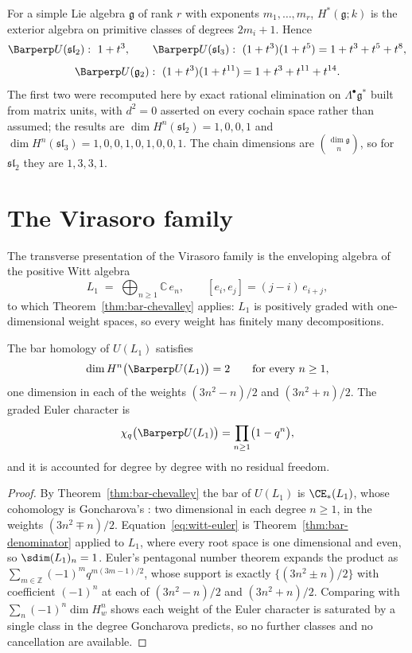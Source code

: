 \begin{computation}
\label{comp:simple}
\StatusComputed{} For a simple Lie algebra $\mathfrak g$ of rank $r$ with
exponents $m_1,\dots,m_r$, $H^*(\mathfrak g;k)$ is the exterior algebra on
primitive classes of degrees $2m_i+1$. Hence
\[
  \Barperp U(\mathfrak{sl}_2):\ 1+t^3, \qquad
  \Barperp U(\mathfrak{sl}_3):\ (1+t^3)(1+t^5) = 1+t^3+t^5+t^8,
\]
\[
  \Barperp U(\mathfrak g_2):\ (1+t^3)(1+t^{11}) = 1+t^3+t^{11}+t^{14}.
\]
The first two were recomputed here by exact rational elimination on
$\Lambda^\bullet\mathfrak g^*$ built from matrix units, with $d^2=0$
asserted on every cochain space rather than assumed; the results are
$\dim H^n(\mathfrak{sl}_2) = 1,0,0,1$ and
$\dim H^n(\mathfrak{sl}_3) = 1,0,0,1,0,1,0,0,1$. The chain dimensions are
$\binom{\dim\mathfrak g}{n}$, so for $\mathfrak{sl}_2$ they are
$1,3,3,1$.
\end{computation}

\section{The Virasoro family}

The transverse presentation of the Virasoro family is the enveloping
algebra of the positive Witt algebra
\[
  L_1 \;=\; \bigoplus_{n\ge1}\mathbb C\,e_n,
  \qquad [e_i,e_j]=(j-i)\,e_{i+j},
\]
to which Theorem~\ref{thm:bar-chevalley} applies: $L_1$ is positively
graded with one-dimensional weight spaces, so every weight has finitely
many decompositions.

\begin{theorem}
\label{thm:pentagonal-rigidity}
\StatusComputed{} The bar homology of $U(L_1)$ satisfies
\[
  \dim H^n\bigl(\Barperp U(L_1)\bigr) = 2
  \qquad\text{for every } n\ge1,
\]
one dimension in each of the weights $(3n^2-n)/2$ and $(3n^2+n)/2$. The
graded Euler character is
\begin{equation}
\label{eq:witt-euler}
  \chi_q\bigl(\Barperp U(L_1)\bigr) = \prod_{n\ge1}\bigl(1-q^n\bigr),
\end{equation}
and it is accounted for degree by degree with no residual freedom.
\end{theorem}

\begin{proof}
By Theorem~\ref{thm:bar-chevalley} the bar of $U(L_1)$ is
$\CE_*(L_1)$, whose cohomology is Goncharova's \cite{Gon73}: two
dimensional in each degree $n\ge1$, in the weights $(3n^2\mp n)/2$.
Equation~\eqref{eq:witt-euler} is Theorem~\ref{thm:bar-denominator}
applied to $L_1$, where every root space is one dimensional and even, so
$\sdim (L_1)_n = 1$. Euler's pentagonal number theorem expands the
product as $\sum_{m\in\mathbb Z}(-1)^mq^{m(3m-1)/2}$, whose support is
exactly $\{(3n^2\pm n)/2\}$ with coefficient $(-1)^n$ at each of
$(3n^2-n)/2$ and $(3n^2+n)/2$. Comparing with $\sum_n(-1)^n\dim H^n_w$
shows each weight of the Euler character is saturated by a single class in
the degree Goncharova predicts, so no further classes and no cancellation
are available.
\end{proof}

